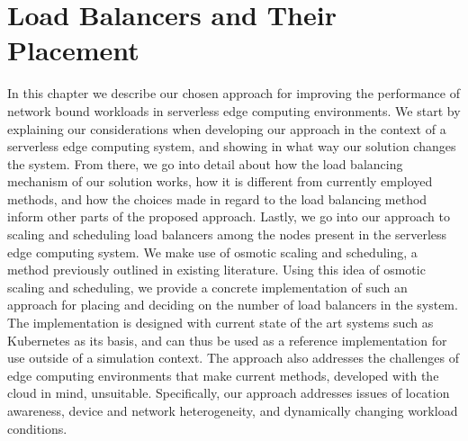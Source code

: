 \chapter{Load Balancers and Their Placement}
In this chapter we describe our chosen approach for improving the performance of network bound workloads in serverless edge computing environments. We start by explaining our considerations when developing our approach in the context of a serverless edge computing system, and showing in what way our solution changes the system. From there, we go into detail about how the load balancing mechanism of our solution works, how it is different from currently employed methods, and how the choices made in regard to the load balancing method inform other parts of the proposed approach.
Lastly, we go into our approach to scaling and scheduling load balancers among the nodes present in the serverless edge computing system. We make use of osmotic scaling and scheduling, a method previously outlined in existing literature. Using this idea of osmotic scaling and scheduling, we provide a concrete implementation of such an approach for placing and deciding on the number of load balancers in the system. The implementation is designed with current state of the art systems such as Kubernetes as its basis, and can thus be used as a reference implementation for use outside of a simulation context. The approach also addresses the challenges of edge computing environments that make current methods, developed with the cloud in mind, unsuitable. Specifically, our approach addresses issues of location awareness, device and network heterogeneity, and dynamically changing workload conditions.


